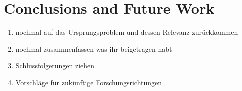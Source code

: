 \section{Conclusions and Future Work}
\label{section:conclusion}

\begin{enumerate}
	\item nochmal auf das Ursprungsproblem und dessen Relevanz zurückkommen
	\item nochmal zusammenfassen was ihr beigetragen habt
	\item Schlussfolgerungen ziehen
	\item Vorschläge für zukünftige Forschungsrichtungen
\end{enumerate}
